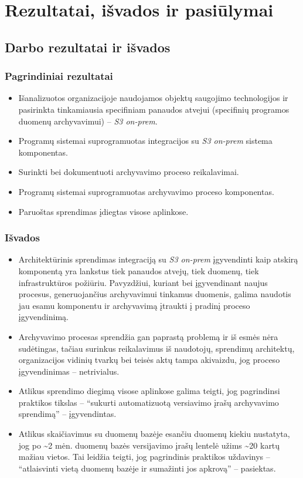 \section{Rezultatai, išvados ir pasiūlymai}

\subsection{Darbo rezultatai ir išvados}

\subsubsection*{Pagrindiniai rezultatai}

\begin{itemize}
    \item Išanalizuotos organizacijoje naudojamos objektų saugojimo technologijos ir pasirinkta tinkamiausia specifiniam panaudos atvejui (specifinių programos duomenų archyvavimui) -- \textit{S3 on-prem}.
    \item Programų sistemai suprogramuotas integracijos su \textit{S3 on-prem} sistema komponentas.
    \item Surinkti bei dokumentuoti archyvavimo proceso reikalavimai.
    \item Programų sistemai suprogramuotas archyvavimo proceso komponentas.
    \item Paruoštas sprendimas įdiegtas visose aplinkose.
\end{itemize}

\subsubsection*{Išvados}

\begin{itemize}
    \item Architektūrinis sprendimas integraciją su \textit{S3 on-prem} įgyvendinti kaip atskirą komponentą yra lankstus tiek panaudos atvejų, tiek duomenų, tiek infrastruktūros požiūriu. Pavyzdžiui, kuriant bei įgyvendinant naujus procesus, generuojančius archyvavimui tinkamus duomenis, galima naudotis jau esamu komponentu ir archyvavimą įtraukti į pradinį proceso įgyvendinimą.
    \item Archyvavimo procesas sprendžia gan paprastą problemą ir iš esmės nėra sudėtingas, tačiau surinkus reikalavimus iš naudotojų, sprendimų architektų, organizacijos vidinių tvarkų bei teisės aktų tampa akivaizdu, jog proceso įgyvendinimas -- netrivialus.
    \item Atlikus sprendimo diegimą visose aplinkose galima teigti, jog pagrindinsi praktikos tikslas -- \enquote{sukurti automatizuotą versiavimo įrašų archyvavimo sprendimą} -- įgyvendintas.
    \item Atlikus skaičiavimus su duomenų bazėje esančiu duomenų kiekiu nustatyta, jog po \sim  2 mėn. duomenų bazės versijavimo įrašų lentelė užims \sim 20 kartų mažiau vietos. Tai leidžia teigti, jog pagrindinis praktikos uždavinys -- \enquote{atlaisvinti vietą duomenų bazėje ir sumažinti jos apkrovą} -- pasiektas.
\end{itemize}

